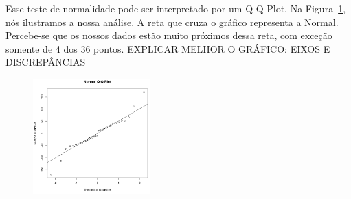 
Esse teste de normalidade pode ser interpretado por um Q-Q Plot. Na Figura~\ref{fig:grafico1}, nós ilustramos a nossa análise. A reta que cruza o gráfico representa a Normal. Percebe-se que os nossos dados estão muito próximos dessa reta, com exceção somente de 4 dos 36 pontos. EXPLICAR MELHOR O GRÁFICO: EIXOS E DISCREPÂNCIAS

\begin{figure}[t]
    \centering
    \includegraphics[width=0.4\textwidth]{images/grafico1.png}
    \caption{}
    \label{fig:grafico1}
\end{figure}